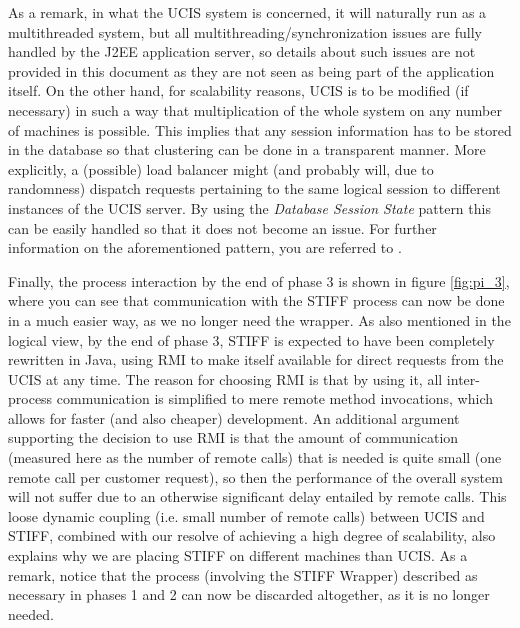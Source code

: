 As a remark, in what the UCIS system is concerned, it will naturally run as a multithreaded system,
but all multithreading/synchronization issues are fully handled by the J2EE application server, so
details about such issues are not provided in this document as they are not seen as being part of the
application itself. On the other hand, for scalability reasons, UCIS is to be modified (if necessary) in such a way that
multiplication of the whole system on any number of machines is possible. This implies that any
session information has to be stored in the database so that clustering can be done in a transparent
manner. More explicitly, a (possible) load balancer might (and probably will, due to randomness)
dispatch requests pertaining to the same logical session to different instances of the UCIS server. By
using the \textit{Database Session State} pattern this can be easily handled so that it does not
become an issue. For further information on the aforementioned pattern, you are referred to \cite{fow03}.

Finally, the process interaction by the end of phase 3 is shown in figure \ref{fig:pi_3}, where you can
see that communication with the STIFF process can now be done in a much easier way, as we no longer
need the wrapper. As also mentioned in the logical view, by the end of phase 3, STIFF is expected to
have been completely rewritten in Java, using RMI to make itself available for direct requests from
the UCIS at any time. The reason for choosing RMI is that by using it, all inter-process communication
is simplified to mere remote method invocations, which allows for faster (and also cheaper) development.
An additional argument supporting the decision to use RMI is that the amount of communication (measured
here as the number of remote calls) that is needed is quite small (one remote call per customer request),
so then the performance of the overall system will not suffer due to an otherwise significant delay entailed
by remote calls. This loose dynamic coupling (i.e. small number of remote calls) between UCIS and STIFF,
combined with our resolve of achieving a high degree of scalability, also explains why we are placing STIFF
on different machines than UCIS. As a remark, notice that the process (involving the STIFF Wrapper)
described as necessary in phases 1 and 2 can now be discarded altogether, as it is no longer needed.

